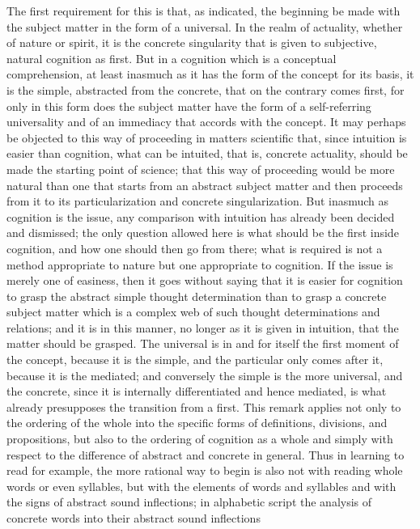 The first requirement for this is that, as indicated,
the beginning be made with the subject matter
in the form of a universal.
In the realm of actuality,
whether of nature or spirit,
it is the concrete singularity that is given to
subjective, natural cognition as first.
But in a cognition which is a conceptual comprehension,
at least inasmuch as it has
the form of the concept for its basis,
it is the simple, abstracted from the concrete,
that on the contrary comes first,
for only in this form does the subject matter have
the form of a self-referring universality
and of an immediacy that accords with the concept.
It may perhaps be objected to
this way of proceeding in matters scientific
that, since intuition is easier than cognition,
what can be intuited, that is, concrete actuality,
should be made the starting point of science;
that this way of proceeding would be more natural
than one that starts from an abstract subject matter
and then proceeds from it to its
particularization and concrete singularization.
But inasmuch as cognition is the issue,
any comparison with intuition has
already been decided and dismissed;
the only question allowed here is
what should be the first inside cognition,
and how one should then go from there;
what is required is not a method appropriate to nature
but one appropriate to cognition.
If the issue is merely one of easiness,
then it goes without saying that
it is easier for cognition to grasp
the abstract simple thought determination
than to grasp a concrete subject matter
which is a complex web of such thought
determinations and relations;
and it is in this manner,
no longer as it is given in intuition,
that the matter should be grasped.
The universal is in and for itself
the first moment of the concept,
because it is the simple,
and the particular only comes after it,
because it is the mediated;
and conversely the simple is the more universal,
and the concrete,
since it is internally differentiated
and hence mediated,
is what already presupposes the transition from a first.
This remark applies not only to the ordering
of the whole into the specific forms of
definitions, divisions, and propositions,
but also to the ordering of cognition as a whole
and simply with respect to the difference of
abstract and concrete in general.
Thus in learning to read for example,
the more rational way to begin is also not
with reading whole words or even syllables,
but with the elements of words and syllables
and with the signs of abstract sound inflections;
in alphabetic script the analysis of concrete words
into their abstract sound inflections
